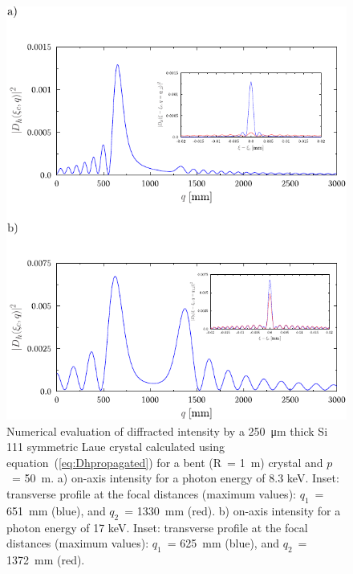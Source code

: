 \documentclass[preprint]{iucr}              %
\begin{document}
\begin{figure}
\label{fig:8keV}
\caption{Numerical evaluation of diffracted intensity by a \SI{250}{\micro\meter} thick Si 111 symmetric Laue crystal calculated using equation~(\ref{eq:Dhpropagated}) for a bent (R~= \SI{1}{\meter}) crystal and $p$~= \SI{50}{\meter}. 
a) on-axis intensity for a photon energy of 8.3 keV. 
Inset: transverse profile at the focal distances (maximum values):  
$q_1$~= \SI{651}{\milli\meter} (blue), and
$q_2$~= \SI{1330}{\milli\meter} (red).
b) on-axis intensity for a photon energy of 17 keV.
Inset: transverse profile at the focal distances (maximum values):
$q_1$~= \SI{625}{\milli\meter} (blue), and 
$q_2$~= \SI{1372}{\milli\meter} (red).
}
\includegraphics[width=1\textwidth]{fig5.pdf}





\end{figure}
\end{document}
